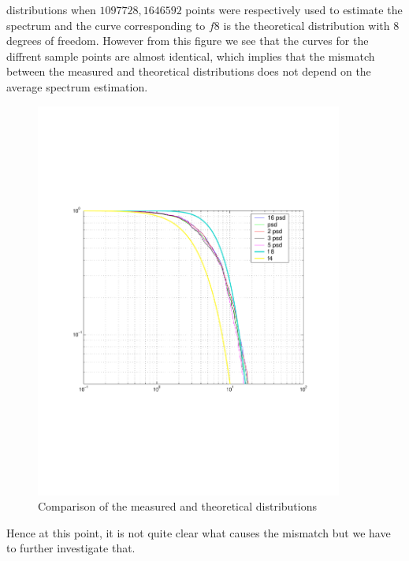 distributions when  $1097728,  1646592$  points were respectively used 
to estimate the spectrum and the curve corresponding to $f8$ is the 
theoretical distribution with $8$ degrees of freedom.  However from 
this figure  we see that the curves for the diffrent sample 
points are almost identical,  which implies that the mismatch between the 
measured and theoretical distributions does not depend on the average 
spectrum estimation.   
\begin{figure}[h]
\begin{center}
\includegraphics[width=0.9\textwidth]{figures/compchisquare}
\caption{Comparison of the measured and theoretical distributions}
\label{fig:compchisquare}
\end{center}
\end{figure}
    
Hence at this point,  it is not quite clear what causes the mismatch but 
we have to further investigate that.

